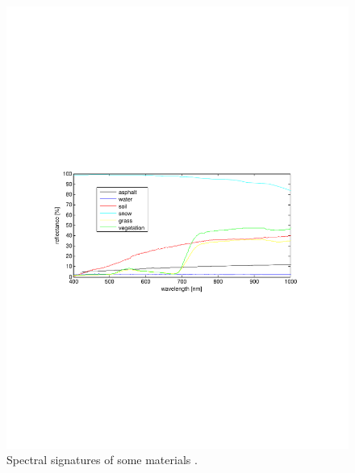 \documentclass[a4paper, 10pt, conference]{ieeeconf}      %
\begin{document}
\begin{figure}[t]
      \centering
      \includegraphics[trim = 12mm 99mm 12mm 99mm, clip,width=0.99\linewidth]{../images/multispectralSignature.pdf}
      \caption{Spectral signatures of some materials \cite{2009_BaHoGrRi}. }
      \label{fig:Multispectral}
   \end{figure}






\end{document}
